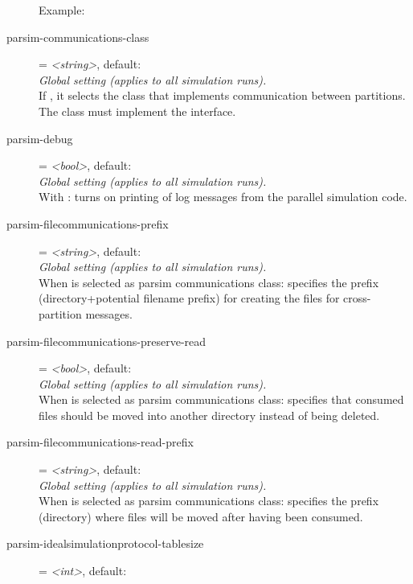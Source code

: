 \begin{description}
    Example:
\item[parsim-communications-class] = \textit{<string>}, default: \\
    \textit{Global setting (applies to all simulation runs).}\\
    If , it selects the
    class that implements communication between partitions. The class must
    implement the  interface.
\item[parsim-debug] = \textit{<bool>}, default: \\
    \textit{Global setting (applies to all simulation runs).}\\
    With : turns on
    printing of log messages from the parallel simulation code.
\item[parsim-filecommunications-prefix] = \textit{<string>}, default: \\
    \textit{Global setting (applies to all simulation runs).}\\
    When  is selected as parsim communications
    class: specifies the prefix (directory+potential filename prefix) for
    creating the files for cross-partition messages.
\item[parsim-filecommunications-preserve-read] = \textit{<bool>}, default: \\
    \textit{Global setting (applies to all simulation runs).}\\
    When  is selected as parsim communications
    class: specifies that consumed files should be moved into another directory
    instead of being deleted.
\item[parsim-filecommunications-read-prefix] = \textit{<string>}, default: \\
    \textit{Global setting (applies to all simulation runs).}\\
    When  is selected as parsim communications
    class: specifies the prefix (directory) where files will be moved after
    having been consumed.
\item[parsim-idealsimulationprotocol-tablesize] = \textit{<int>}, default: \\

\end{description}
